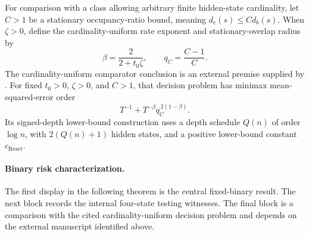 For comparison with a class allowing arbitrary finite hidden-state cardinality, let \(C>1\) be a stationary occupancy-ratio bound, meaning \(d_e(s)\leq C d_b(s)\). When \(\zeta>0\), define the cardinality-uniform rate exponent  and stationary-overlap radius  by
\[
\beta=\frac{2}{2+t_0\zeta},
\qquad
q_C=\frac{C-1}{C}.
\]
The cardinality-uniform comparator conclusion is an external premise supplied by \citet[Theorem 1 (Uniform overlap frontier) and the Signed-depth family definition]{CausalSmithLatentOverlap2026}. For fixed \(t_0>0\), \(\zeta>0\), and \(C>1\), that decision problem has minimax mean-squared-error order
\[
T^{-1}+T^{-\beta}q_C^{\,2(1-\beta)}.
\]
Its signed-depth lower-bound construction uses a depth schedule \(Q(n)\) of order \(\log n\), with \(2(Q(n)+1)\) hidden states, and a positive lower-bound constant \(c_{\mathrm{Reset}}\).

\paragraph{Binary risk characterization.}
The first display in the following theorem is the central fixed-binary result. The next block records the internal four-state testing witnesses. The final block is a comparison with the cited cardinality-uniform decision problem and depends on the external manuscript identified above.

